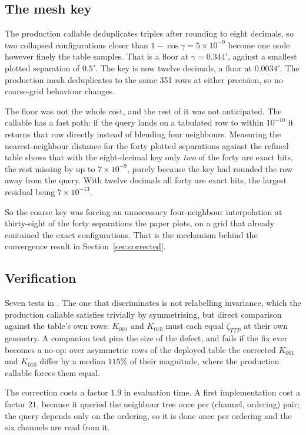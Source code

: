 \subsection{The mesh key}

The production callable deduplicates triples after rounding to eight
decimals, so two collapsed configurations closer than
$1-\cos\gamma = 5\times10^{-9}$ become one node however finely the table
samples. That is a floor at $\gamma = 0.344'$, against a smallest plotted
separation of $0.5'$. The key is now twelve decimals, a floor at
$0.0034'$. The production mesh deduplicates to the same 351 rows at either
precision, so no coarse-grid behaviour changes.

The floor was not the whole cost, and the rest of it was not anticipated.
The callable has a fast path: if the query lands on a tabulated row to
within $10^{-10}$ it returns that row directly instead of blending four
neighbours. Measuring the nearest-neighbour distance for the forty plotted
separations against the refined table shows that with the eight-decimal key
only \emph{two} of the forty are exact hits, the rest missing by up to
$7\times10^{-9}$, purely because the key had rounded the row away from the
query. With twelve decimals all forty are exact hits, the largest residual
being $7\times10^{-13}$.

So the coarse key was forcing an unnecessary four-neighbour interpolation
at thirty-eight of the forty separations the paper plots, on a grid that
already contained the exact configurations. That is the mechanism behind
the convergence result in Section~\ref{sec:corrected}.

\subsection{Verification}

Seven tests in . The one that
discriminates is not relabelling invariance, which the production callable
satisfies trivially by symmetrising, but direct comparison against the
table's own rows: $K_{001}$ and $K_{010}$ must each equal $\zeta_{TTP}$ at
their own geometry. A companion test pins the size of the defect, and fails
if the fix ever becomes a no-op: over asymmetric rows of the deployed table
the corrected $K_{001}$ and $K_{010}$ differ by a median $115\%$ of their
magnitude, where the production callable forces them equal.

The correction costs a factor $1.9$ in evaluation time. A first
implementation cost a factor $21$, because it queried the neighbour tree
once per (channel, ordering) pair; the query depends only on the ordering,
so it is done once per ordering and the six channels are read from it.

